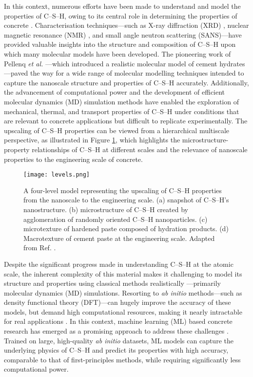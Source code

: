 In this context, numerous efforts have been made to understand and model the properties of C--S--H, owing to its central role in determining the properties of concrete \cite{Ji2012, Papatzani2015, Qomi2020}. Characterisation techniques---such as X-ray diffraction (XRD) \cite{Allen2007, Houston2009, Oh2012}, nuclear magnetic resonance (NMR) \cite{Foley2012, Maddalena2019}, and small angle neutron scattering (SANS)---have provided valuable insights into the structure and composition of C--S--H upon which many molecular models have been developed. The pioneering work of Pellenq \emph{et al.} \cite{Pellenq2009}---which introduced a realistic molecular model of cement hydrates---paved the way for a wide range of molecular modelling techniques \cite{AbdolhosseiniQomi2014, Richardson2014, Bauchy2014, Kovacevic2016, KunhiMohamed2018} intended to capture the nanoscale structure and properties of C--S--H accurately. Additionally, the advancement of computational power and the development of efficient molecular dynamics (MD) simulation methods have enabled the exploration of mechanical, thermal, and transport properties of C--S--H \cite{
AbdolhosseiniQomi2015, Bahraq2022, Cho2020, Barbhuiya2023} under conditions that are relevant to concrete applications but difficult to replicate experimentally. The upscaling of C--S--H properties can be viewed from a hierarchical multiscale perspective, as illustrated in Figure \ref{fig:figure1}, which highlights the microstructure-property relationships of C--S--H at different scales and the relevance of nanoscale properties to the engineering scale of concrete.
\begin{figure}[H]
    \centering
    \texttt{[image: levels.png]}
    \caption{A four-level model representing the upscaling of C--S--H properties from the nanoscale to the engineering scale. (a) snapshot of C--S--H's nanostructure. (b) microstructure of C--S--H created by agglomeration of randomly oriented C--S--H nanoparticles. (c) microtexture of hardened paste composed of hydration products. (d) Macrotexture of cement paste at the engineering scale. Adapted from Ref. \cite{AbdolhosseiniQomi2015}.}
    \label{fig:figure1}
\end{figure}

Despite the significant progress made in understanding C--S--H at the atomic scale, the inherent complexity of this material makes it challenging to model its structure and properties using classical methods realistically ---primarily molecular dynamics (MD) simulations. Resorting to \emph{ab initio} methods---such as density functional theory (DFT)---can hugely improve the accuracy of these models, but demand high computational resources, making it nearly intractable for real applications \cite{zotero-item-16}. In this context, machine learning (ML) based concrete research has emerged as a promising approach to address these challenges \cite{zotero-item-16, Kobayashi2021, Zhu2024}. Trained on large, high-quality \emph{ab initio} datasets, ML models can capture the underlying physics of C--S--H and predict its properties with high accuracy, comparable to that of first-principles methods, while requiring significantly less computational power. 

